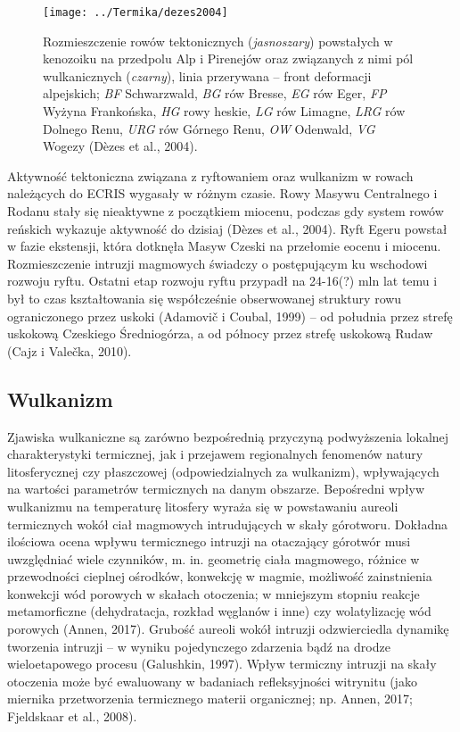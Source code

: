 \documentclass[11.5pt,twoside]{report}
\begin{document}
\begin{figure}[h]
	\centering
	\texttt{[image: ../Termika/dezes2004]}
	\caption{Rozmieszczenie rowów tektonicznych (\textit{jasnoszary}) powstałych w kenozoiku na przedpolu Alp i Pirenejów oraz związanych z nimi pól wulkanicznych (\textit{czarny}), linia przerywana -- front deformacji alpejskich; \textit{BF} Schwarzwald, \textit{BG} rów Bresse, \textit{EG} rów Eger, \textit{FP} Wyżyna Frankońska, \textit{HG} rowy heskie, \textit{LG} rów Limagne, \textit{LRG} rów Dolnego Renu, \textit{URG} rów Górnego Renu, \textit{OW} Odenwald, \textit{VG} Wogezy (D\`{e}zes et al., 2004).}
\label{Fig.}
\end{figure}

Aktywność tektoniczna związana z ryftowaniem oraz wulkanizm w rowach należących do ECRIS wygasały w różnym czasie. Rowy Masywu Centralnego i Rodanu stały się nieaktywne z początkiem miocenu, podczas gdy system rowów reńskich wykazuje aktywność do dzisiaj (D\`{e}zes et al., 2004). Ryft Egeru powstał w fazie ekstensji, która dotknęła Masyw Czeski na przełomie eocenu i miocenu. Rozmieszczenie intruzji magmowych świadczy o postępującym ku wschodowi rozwoju ryftu. Ostatni etap rozwoju ryftu przypadł na 24-16(?) mln lat temu i był to czas kształtowania się współcześnie obserwowanej struktury rowu ograniczonego przez uskoki (Adamovič i Coubal, 1999) -- od południa przez strefę uskokową Czeskiego Średniogórza, a od północy przez strefę uskokową Rudaw (Cajz i Valečka, 2010).

	
	\subsection{Wulkanizm}
	
Zjawiska wulkaniczne są zarówno bezpośrednią przyczyną podwyższenia lokalnej charakterystyki termicznej, jak i przejawem regionalnych fenomenów natury litosferycznej czy płaszczowej (odpowiedzialnych za wulkanizm), wpływających na wartości parametrów termicznych na danym obszarze. Bepośredni wpływ wulkanizmu na temperaturę litosfery wyraża się w powstawaniu aureoli termicznych wokół ciał magmowych intrudujących w skały górotworu. Dokładna ilościowa ocena wpływu termicznego intruzji na otaczający górotwór musi uwzględniać wiele czynników, m. in. geometrię ciała magmowego, różnice w przewodności cieplnej ośrodków, konwekcję w magmie, możliwość zainstnienia konwekcji wód porowych w skałach otoczenia; w mniejszym stopniu reakcje metamorficzne (dehydratacja, rozkład węglanów i inne) czy wolatylizację wód porowych (Annen, 2017). Grubość aureoli wokół intruzji odzwierciedla dynamikę tworzenia intruzji -- w wyniku pojedynczego zdarzenia bąd\'{z} na drodze wieloetapowego procesu (Galushkin, 1997). Wpływ termiczny intruzji na skały otoczenia może być ewaluowany w badaniach refleksyjności witrynitu (jako miernika przetworzenia termicznego materii organicznej; np. Annen, 2017; Fjeldskaar et al., 2008). 
\end{document}
